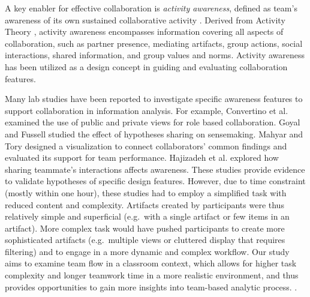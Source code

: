 
A key enabler for effective collaboration is \emph{activity awareness}, defined as
team's awareness of its own sustained collaborative activity
\cite{Carroll2003,Carroll2006}. Derived from Activity Theory \cite{Leontev1974},
activity awareness encompasses information covering all aspects of collaboration, such as partner presence, mediating artifacts, group actions, social interactions, shared information, and group values and norms. Activity awareness has been utilized as a design concept in guiding and evaluating collaboration features.

Many lab studies have been reported to investigate specific awareness features
to support collaboration in information analysis. For example, Convertino et al.
\cite{Convertino2011} examined the use of public and private views for role
based collaboration. Goyal and Fussell \cite{Goyal2016} studied the effect of
hypotheses sharing on sensemaking. Mahyar and Tory \cite{Mahyar2013b} designed a
visualization to connect collaborators' common findings and evaluated its
support for team performance. Hajizadeh et al. \cite{Hajizadeh2013} explored how
sharing teammate's interactions affects awareness. These studies provide
evidence to validate hypotheses of specific design features. However, due to
time constraint (mostly within one hour), these studies had to employ a
simplified task with reduced content and complexity. Artifacts created by
participants were thus relatively simple and superficial (e.g.~with a single
artifact or few items in an artifact). More complex task would have pushed
participants to create more sophisticated artifacts (e.g.~multiple views or
cluttered display that requires filtering) and to engage in a more dynamic and
complex workflow. Our study aims to examine team flow in a classroom context,
which allows for higher task complexity and longer teamwork time in a more
realistic environment, and thus provides opportunities to gain more insights
into team-based analytic process. .
